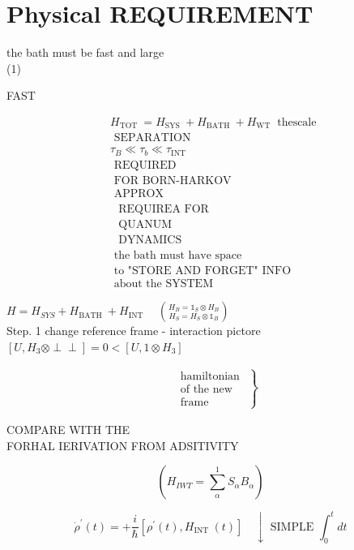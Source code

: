 \documentclass[10pt]{article}
\def\Perp{\perp\!\!\!\perp}
\begin{document}
\section*{Physical REQUIREMENT}
the bath must be fast and large\\
(1)

FAST

$$
\begin{aligned}
& H_{\text {TOT }}=H_{\text {SYS }}+H_{\text {BATH }}+H_{\text {WT }} \text { thescale } \\
& \text { SEPARATION } \\
& \tau_{B} \ll \tau_{b} \ll \tau_{\text {INT }} \\
& \text { REQUIRED } \\
& \text { FOR BORN-HARKOV } \\
& \text { APPROX } \\
& \begin{array}{l}
\text { REQUIREA FOR } \\
\text { QUANUM } \\
\text { DYNAMICS }
\end{array} \\
& \text { the bath must have space } \\
& \text { to "STORE AND FORGET" INFO } \\
& \text { about the SYSTEM }
\end{aligned}
$$

$H=H_{S Y S}+H_{\text {BATH }}+H_{\text {INT }} \quad\binom{H_{B}=\mathbb{1}_{S} \otimes H_{B}}{H_{S}=H_{S} \otimes \mathbb{1}_{B}}$\\
Step. 1 change reference frame - interaction pictore\\
$\left[U, H_{3} \otimes \Perp\right]=0<\left[U, 1 \otimes H_{3}\right]$

$$
\begin{aligned}
& \left.\begin{array}{l}
\text { hamiltonian } \\
\text { of the new } \\
\text { frame }
\end{array}\right\}
\end{aligned}
$$

COMPARE WITH THE\\
FORHAL IERIVATION FROM ADSITIVITY

$$
\left(H_{I W T}=\sum_{\alpha}^{1} S_{\alpha} B_{\alpha}\right)
$$

$$
\dot{\rho}^{\prime}(t)=+\frac{i}{\hbar}\left[\rho^{\prime}(t), H_{\text {INT }}(t)\right] \quad \downarrow \text { SIMPLE } \int_{0}^{t} d t
$$
\end{document}
